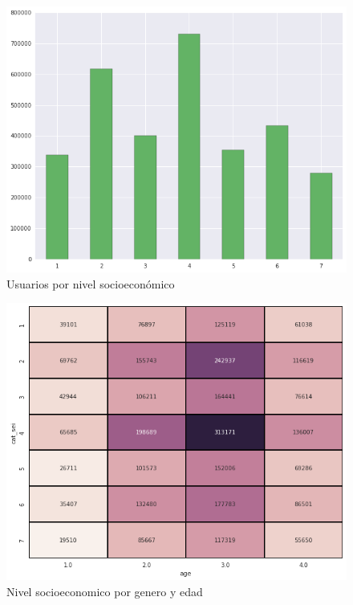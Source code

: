 \documentclass{llncs}
\begin{document}
\begin{figure}
\center
\includegraphics[width=\columnwidth]{Figures/sei_hist}
\caption{Usuarios por nivel socioeconómico}
\end{figure}

\begin{figure}
\center
\includegraphics[width=\columnwidth]{Figures/sei_age_heatmap}
\caption{Nivel socioeconomico por genero y edad}
\end{figure}




% 


\end{document}
